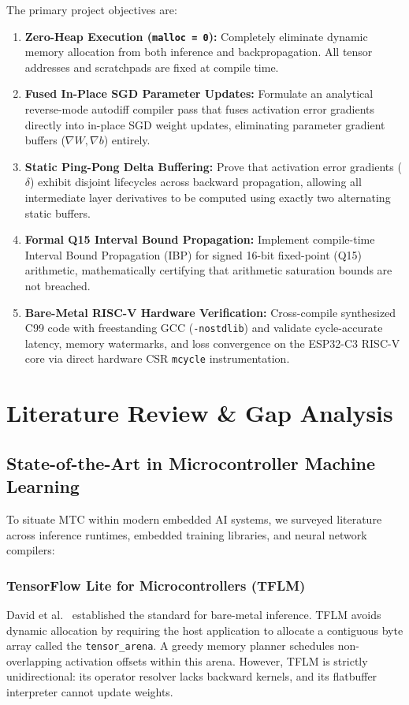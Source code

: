 \documentclass[12pt,a4paper]{report}
\begin{document}
The primary project objectives are:
\begin{enumerate}
    \item \textbf{Zero-Heap Execution (\texttt{malloc = 0}):} Completely eliminate dynamic memory allocation from both inference and backpropagation. All tensor addresses and scratchpads are fixed at compile time.
    \item \textbf{Fused In-Place SGD Parameter Updates:} Formulate an analytical reverse-mode autodiff compiler pass that fuses activation error gradients directly into in-place SGD weight updates, eliminating parameter gradient buffers ($\nabla W, \nabla b$) entirely.
    \item \textbf{Static Ping-Pong Delta Buffering:} Prove that activation error gradients ($\delta$) exhibit disjoint lifecycles across backward propagation, allowing all intermediate layer derivatives to be computed using exactly two alternating static buffers.
    \item \textbf{Formal Q15 Interval Bound Propagation:} Implement compile-time Interval Bound Propagation (IBP) for signed 16-bit fixed-point (Q15) arithmetic, mathematically certifying that arithmetic saturation bounds are not breached.
    \item \textbf{Bare-Metal RISC-V Hardware Verification:} Cross-compile synthesized C99 code with freestanding GCC (\texttt{-nostdlib}) and validate cycle-accurate latency, memory watermarks, and loss convergence on the ESP32-C3 RISC-V core via direct hardware CSR \texttt{mcycle} instrumentation.
\end{enumerate}

\chapter{Literature Review \& Gap Analysis}

\section{State-of-the-Art in Microcontroller Machine Learning}
To situate MTC within modern embedded AI systems, we surveyed literature across inference runtimes, embedded training libraries, and neural network compilers:

\subsection{TensorFlow Lite for Microcontrollers (TFLM)}
David et al.~\cite{david2021tensorflow} established the standard for bare-metal inference. TFLM avoids dynamic allocation by requiring the host application to allocate a contiguous byte array called the \texttt{tensor\_arena}. A greedy memory planner schedules non-overlapping activation offsets within this arena. However, TFLM is strictly unidirectional: its operator resolver lacks backward kernels, and its flatbuffer interpreter cannot update weights.
\end{document}
